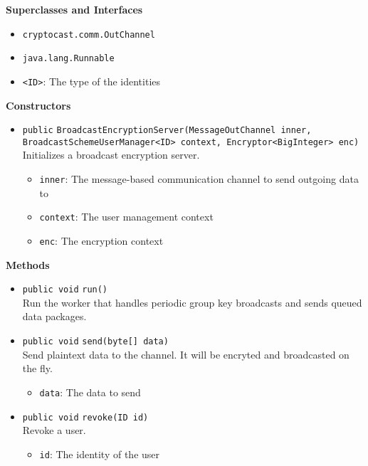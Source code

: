 \textbf{Superclasses and Interfaces}
\begin{itemize}
\item \lstinline|cryptocast.comm.OutChannel|
\item \lstinline|java.lang.Runnable|
\end{itemize}

\begin{itemize}
\item \lstinline|<ID>|: The type of the identities
\end{itemize}


\textbf{Constructors}
\begin{itemize}
\item \lstinline|public| \lstinline|BroadcastEncryptionServer|\lstinline|(MessageOutChannel inner, BroadcastSchemeUserManager<ID> context, Encryptor<BigInteger> enc)|\\
Initializes a broadcast encryption server.
\begin{itemize}
\item \lstinline|inner|: The message-based communication channel to send outgoing data to
\item \lstinline|context|: The user management context
\item \lstinline|enc|: The encryption context
\end{itemize}



\end{itemize}


\textbf{Methods}
\begin{itemize}
\item \lstinline|public void| \lstinline|run|\lstinline|()|\\
Run the worker that handles periodic group key broadcasts and sends
 queued data packages.



\item \lstinline|public void| \lstinline|send|\lstinline|(byte[] data)|\\
Send plaintext data to the channel. It will be encryted and broadcasted
 on the fly.
\begin{itemize}
\item \lstinline|data|: The data to send
\end{itemize}



\item \lstinline|public void| \lstinline|revoke|\lstinline|(ID id)|\\
Revoke a user.
\begin{itemize}
\item \lstinline|id|: The identity of the user
\end{itemize}



\end{itemize}

